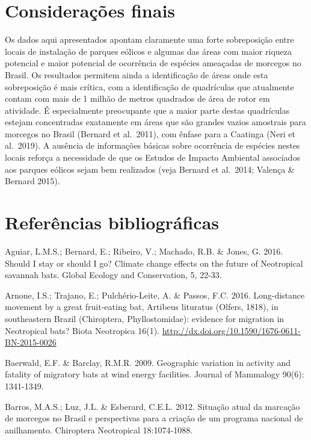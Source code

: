 \documentclass[
  oneside]{scrbook}
\begin{document}
\hypertarget{cons-finais-morcegos}{%
\section{Considerações finais}\label{cons-finais-morcegos}}

Os dados aqui apresentados apontam claramente uma forte sobreposição entre locais de instalação de parques eólicos e algumas das áreas com maior riqueza potencial e maior potencial de ocorrência de espécies ameaçadas de morcegos no Brasil. Os resultados permitem ainda a identificação de áreas onde esta sobreposição é mais crítica, com a identificação de quadrículas que atualmente contam com mais de 1 milhão de metros quadrados de área de rotor em atividade. É especialmente preocupante que a maior parte destas quadrículas estejam concentradas exatamente em áreas que são grandes vazios amostrais para morcegos no Brasil (Bernard et al.~2011), com ênfase para a Caatinga (Neri et al.~2019). A ausência de informações básicas sobre ocorrência de espécies nestes locais reforça a necessidade de que os Estudos de Impacto Ambiental associados aos parques eólicos sejam bem realizados (veja Bernard et al.~2014; Valença \& Bernard 2015).

\hypertarget{referencias-morcegos}{%
\section{Referências bibliográficas}\label{referencias-morcegos}}

Aguiar, L.M.S.; Bernard, E.; Ribeiro, V.; Machado, R.B. \& Jones, G. 2016. Should I stay or should I go? Climate change effects on the future of Neotropical savannah bats. Global Ecology and Conservation, 5, 22-33.

Arnone, I.S.; Trajano, E.; Pulchério-Leite, A. \& Passos, F.C. 2016. Long-distance movement by a great fruit-eating bat, Artibeus lituratus (Olfers, 1818), in southeastern Brazil (Chiroptera, Phyllostomidae): evidence for migration in Neotropical bats? Biota Neotropica 16(1). \url{http://dx.doi.org/10.1590/1676-0611-BN-2015-0026}

Baerwald, E.F. \& Barclay, R.M.R. 2009. Geographic variation in activity and fatality of migratory bats at wind energy facilities. Journal of Mammalogy 90(6): 1341-1349.

Barros, M.A.S.; Luz, J.L. \& Esberard, C.E.L. 2012. Situação atual da marcação de morcegos no Brasil e perspectivas para a criação de um programa nacional de anilhamento. Chiroptera Neotropical 18:1074-1088.
\end{document}
